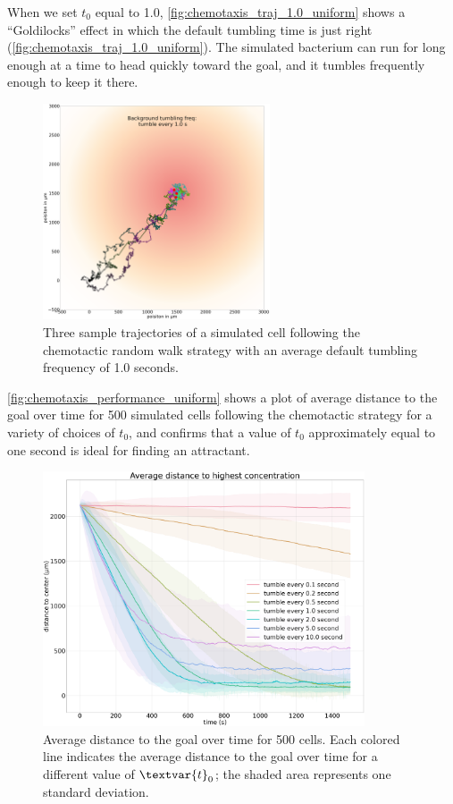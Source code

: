 When we set $t_0$ equal to 1.0, \autoref{fig:chemotaxis_traj_1.0_uniform} shows a ``Goldilocks'' effect in which the default tumbling time is just right (\autoref{fig:chemotaxis_traj_1.0_uniform}). The simulated bacterium can run for long enough at a time to head quickly toward the goal, and it tumbles frequently enough to keep it there.

\begin{figure}[h]
\centering
\mySfFamily
\includegraphics[width = 0.6\textwidth]{../images/chemotaxis_traj_1.0_uniform.png}
\caption{Three sample trajectories of a simulated cell following the chemotactic random walk strategy with an average default tumbling frequency of 1.0 seconds.}
\label{fig:chemotaxis_traj_1.0_uniform}
\end{figure}


\autoref{fig:chemotaxis_performance_uniform} shows a plot of average distance to the goal over time for 500 simulated cells following the chemotactic strategy for a variety of choices of $t_0$, and confirms that a value of $t_0$ approximately equal to one second is ideal for finding an attractant.


\begin{figure}[h]
\centering
\mySfFamily
\includegraphics[width = 0.85\textwidth]{../images/chemotaxis_performance_uniform.png}
\caption{Average distance to the goal over time for 500 cells. Each colored line indicates the average distance to the goal over time for a different value of $\textvar{t}_\text{0}$; the shaded area represents one standard deviation.}
\label{fig:chemotaxis_performance_uniform}
\end{figure}

